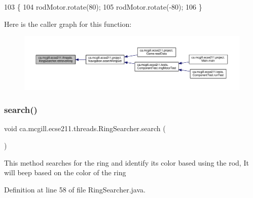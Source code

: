 \begin{DoxyCode}
103                              \{
104     rodMotor.rotate(80);
105     rodMotor.rotate(-80);
106   \}
\end{DoxyCode}
Here is the caller graph for this function\+:
\nopagebreak
\begin{figure}[H]
\begin{center}
\leavevmode
\includegraphics[width=350pt]{classca_1_1mcgill_1_1ecse211_1_1threads_1_1_ring_searcher_abd7a2651a7c5de76a018664c8bf327af_icgraph}
\end{center}
\end{figure}
\mbox{\label{classca_1_1mcgill_1_1ecse211_1_1threads_1_1_ring_searcher_abd2b2c172ea393ce4185027c8a12780f}} 
\subsubsection{\texorpdfstring{search()}{search()}}
{\footnotesize\ttfamily void ca.\+mcgill.\+ecse211.\+threads.\+Ring\+Searcher.\+search (\begin{DoxyParamCaption}{ }\end{DoxyParamCaption})}

This method searches for the ring and identify its color based using the rod, It will beep based on the color of the ring 

Definition at line 58 of file Ring\+Searcher.\+java.


